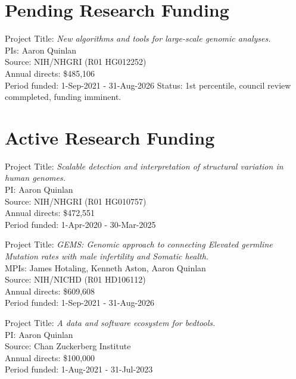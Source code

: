 \documentclass[margin,line]{cv}
\begin{document}
\begin{resume}
\begin{list}{*}{}
    \end{list}




    \section{\mysidestyle Pending Research Funding}

    Project Title: \textit{New algorithms and tools for large-scale genomic analyses.} \\
    PIs: Aaron Quinlan \\
    Source: NIH/NHGRI (R01 HG012252) \\
    Annual directs: \$485,106 \\
    Period funded: 1-Sep-2021 - 31-Aug-2026
    Status: 1st percentile, council review commpleted, funding imminent. 

    \section{\mysidestyle Active Research Funding}

    Project Title: \textit{Scalable detection and interpretation of structural variation in human genomes.} \\
    PI: Aaron Quinlan \\
    Source: NIH/NHGRI (R01 HG010757) \\
    Annual directs: \$472,551 \\
    Period funded: 1-Apr-2020 - 30-Mar-2025

    Project Title: \textit{GEMS: Genomic approach to connecting Elevated germline Mutation rates with male infertility and Somatic health.} \\
    MPIs: James Hotaling, Kenneth Aston, Aaron Quinlan \\
    Source: NIH/NICHD (R01 HD106112) \\
    Annual directs: \$609,608 \\
    Period funded: 1-Sep-2021 - 31-Aug-2026

    Project Title: \textit{A data and software ecosystem for bedtools.} \\
    PI: Aaron Quinlan \\
    Source: Chan Zuckerberg Institute \\
    Annual directs: \$100,000 \\
    Period funded: 1-Aug-2021 - 31-Jul-2023


\end{resume}
\end{document}

